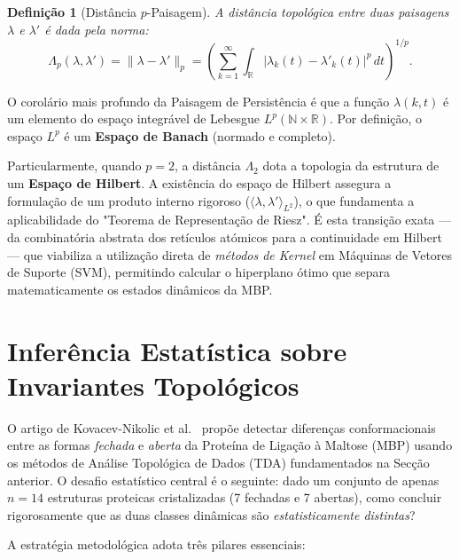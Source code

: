 \documentclass[12pt, a4paper]{article}
\newtheorem{definition}{Definição}
\begin{document}
\begin{definition}[Distância $p$-Paisagem]
A distância topológica entre duas paisagens $\lambda$ e $\lambda'$ é dada pela norma:
\begin{equation}
\Lambda_p(\lambda, \lambda') = \|\lambda - \lambda'\|_p = \left( \sum_{k=1}^\infty \int_{\mathbb{R}} |\lambda_k(t) - \lambda'_k(t)|^p \, dt \right)^{1/p}.
\end{equation}
\end{definition}

O corolário mais profundo da Paisagem de Persistência é que a função $\lambda(k,t)$ é um elemento do espaço integrável de Lebesgue $L^p(\mathbb{N} \times \mathbb{R})$. Por definição, o espaço $L^p$ é um \textbf{Espaço de Banach} (normado e completo). 

Particularmente, quando $p=2$, a distância $\Lambda_2$ dota a topologia da estrutura de um \textbf{Espaço de Hilbert}. A existência do espaço de Hilbert assegura a formulação de um produto interno rigoroso ($\langle \lambda, \lambda' \rangle_{L^2}$), o que fundamenta a aplicabilidade do "Teorema de Representação de Riesz". É esta transição exata --- da combinatória abstrata dos retículos atómicos para a continuidade em Hilbert --- que viabiliza a utilização direta de \emph{métodos de Kernel} em Máquinas de Vetores de Suporte (SVM), permitindo calcular o hiperplano ótimo que separa matematicamente os estados dinâmicos da MBP.

\section{Inferência Estatística sobre Invariantes Topológicos}
\label{sec:inferencia_estatistica}
 
O artigo de Kovacev-Nikolic et al.~\cite{kovacev2016} propõe detectar diferenças conformacionais entre as formas \emph{fechada} e \emph{aberta} da Proteína de Ligação à Maltose (MBP) usando os métodos de Análise Topológica de Dados (TDA) fundamentados na Secção anterior. O desafio estatístico central é o seguinte: dado um conjunto de apenas $n = 14$ estruturas proteicas cristalizadas (7 fechadas e 7 abertas), como concluir rigorosamente que as duas classes dinâmicas são \emph{estatisticamente distintas}?
 
A estratégia metodológica adota três pilares essenciais:
 
\end{document}
